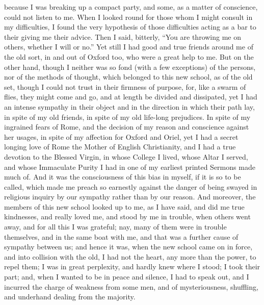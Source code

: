 because I was breaking up a compact party, and some, as a matter of
conscience, could not listen to me. When I looked round for those
whom I might consult in my difficulties, I found the very hypothesis of
those difficulties acting as a bar to their giving me their advice.
Then I said, bitterly, ``You are throwing me on others, whether
I will or no.'' Yet still I had good and true friends around me of
the old sort, in and out of Oxford too, who were a great help to
me. But on the other hand, though I neither was so fond (with a
few exceptions) of the persons, nor of the methods of thought, which
belonged to this new school, as of the old
set, though I could not trust in their firmness of purpose, for, like a
swarm of flies, they might come and go, and at length be divided and
dissipated, yet I had an intense sympathy in their object and in the
direction in which their path lay, in spite of my old friends, in spite
of my old life-long prejudices. In spite of my ingrained fears of Rome,
and the decision of my reason and conscience against her usages,
in spite of my affection for Oxford and Oriel, yet I had a secret
longing love of Rome the Mother of English Christianity, and I
had a true devotion to the Blessed Virgin, in whose College I lived,
whose Altar I served, and whose Immaculate Purity I had in one of my
earliest printed Sermons made much of. And it was the consciousness of
this bias in myself, if it is so to be called, which made me preach so
earnestly against the danger of being swayed in religious
inquiry by our sympathy rather than by our reason. And moreover, the members of this new school looked
up to me, as I have said, and did me true kindnesses, and really loved
me, and stood by me in trouble, when others went away, and for all this
I was grateful; nay, many of them were in trouble themselves, and in the
same boat with me, and that was a further cause of sympathy between us;
and hence it was, when the new school came on in force, and into
collision with the old, I had not the heart, any more than the power, to
repel them; I was in great perplexity, and hardly knew where I stood; I
took their part; and, when I wanted to be in peace and silence, I had to
speak out, and I incurred the charge of weakness from some men, and of
mysteriousness, shuffling, and underhand dealing from the majority.

